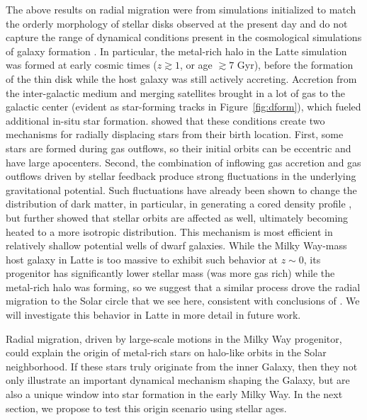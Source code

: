 \documentclass[apj, twocolappendix, numberedappendix, appendixfloats]{emulateapj}
\begin{document}
The above results on radial migration were from simulations initialized to match the orderly morphology of stellar disks observed at the present day and do not capture the range of dynamical conditions present in the cosmological simulations of galaxy formation \citep[e.g.,][]{agertz2009}.
In particular, the metal-rich halo in the Latte simulation was formed at early cosmic times ($z \gtrsim 1$, or age $\gtrsim 7$ Gyr), before the formation of the thin disk \citep{ma2016} while the host galaxy was still actively accreting.
Accretion from the inter-galactic medium and merging satellites brought in a lot of gas to the galactic center (evident as star-forming tracks in Figure~\ref{fig:dform}), which fueled additional in-situ star formation.
\citet{elbadry2016} showed that these conditions create two mechanisms for radially displacing stars from their birth location.
First, some stars are formed during gas outflows, so their initial orbits can be eccentric and have large apocenters.
Second, the combination of inflowing gas accretion and gas outflows driven by stellar feedback produce strong fluctuations in the underlying gravitational potential.
Such fluctuations have already been shown to change the distribution of dark matter, in particular, in generating a cored density profile \citep[e.g.,][]{pontzen2012, brooks2014, dicintio2014, chan:fire.dwarf.cusps}, but \citet{elbadry2016} further showed that stellar orbits are affected as well, ultimately becoming heated to a more isotropic distribution.
This mechanism is most efficient in relatively shallow potential wells of dwarf galaxies.
While the Milky Way-mass host galaxy in Latte is too massive to exhibit such behavior at $z \sim 0$, its progenitor has significantly lower stellar mass (was more gas rich) while the metal-rich halo was forming, so we suggest that a similar process drove the radial migration to the Solar circle that we see here, consistent with conclusions of \citet{ma2017}.
We will investigate this behavior in Latte in more detail in future work.

Radial migration, driven by large-scale motions in the Milky Way progenitor, could explain the origin of metal-rich stars on halo-like orbits in the Solar neighborhood.
If these stars truly originate from the inner Galaxy, then they not only illustrate an important dynamical mechanism shaping the Galaxy, but are also a unique window into star formation in the early Milky Way.
In the next section, we propose to test this origin scenario using stellar ages.


\end{document}
